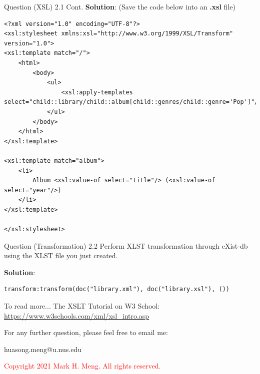 \begin{frame}[fragile]{Question (XSL) 2.1 Cont.}
\textbf{Solution}: (Save the code below into an \textbf{.xsl} file)\\
\begin{lstlisting}[style=xml-small-nomargin]
<?xml version="1.0" encoding="UTF-8"?>
<xsl:stylesheet xmlns:xsl="http://www.w3.org/1999/XSL/Transform" version="1.0">
<xsl:template match="/">
	<html>
		<body>
			<ul>
				<xsl:apply-templates select="child::library/child::album[child::genres/child::genre='Pop']"/>
			</ul>
		</body>
	</html>
</xsl:template>

<xsl:template match="album">
	<li>
		Album <xsl:value-of select="title"/> (<xsl:value-of select="year"/>)
	</li>
</xsl:template>

</xsl:stylesheet>
\end{lstlisting}\vspace{5pt}

\end{frame}

\begin{frame}[fragile]{Question (Transformation) 2.2}
Perform XLST transformation through eXist-db using the XLST file you just created.\\\vspace{5pt}

\textbf{Solution}:

\begin{lstlisting}[style=xml-small-nomargin]
transform:transform(doc("library.xml"), doc("library.xsl"), ())
\end{lstlisting}\vspace{5pt}

\begin{block}{To read more...}
	The XSLT Tutorial on W3 School: \url{https://www.w3schools.com/xml/xsl_intro.asp}
\end{block}	
\end{frame}

\begin{frame}{}
	\centering  
	For any further question, please feel free to email me:\vspace{10pt}
	
	huasong.meng@u.nus.edu \vspace{20pt}
	
	\begin{tcolorbox}
		\begin{center}
			\textcolor{red}{Copyright 2021 Mark H. Meng. All rights reserved.}
		\end{center}
	\end{tcolorbox}
\end{frame}